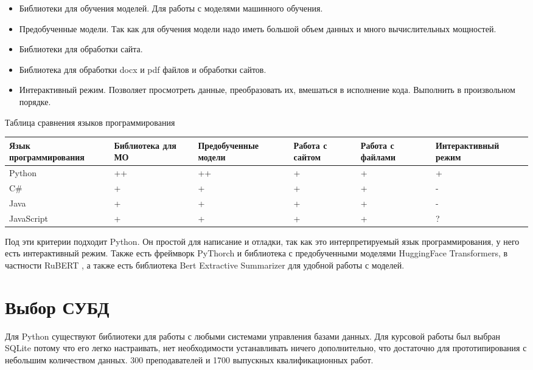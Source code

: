 \documentclass[PI,KR]{HSEUniversity}
\begin{document}
\begin{itemize}
	\item Библиотеки для обучения моделей. Для работы с моделями машинного обучения.
	\item Предобученные модели. Так как для обучения модели надо иметь большой объем данных и много вычислительных мощностей.
	\item Библиотеки для обработки сайта.
	\item Библиотека для обработки docx и pdf файлов и обработки сайтов.
	\item Интерактивный режим. Позволяет просмотреть данные, преобразовать их, вмешаться в исполнение кода. Выполнить в произвольном порядке.
\end{itemize} 

\begin{TABLE}[!h]{Таблица сравнения языков программирования \label{tbl:tableProg}}
	\begin{tabular}[c]{|p{3cm}|p{2cm}|p{3cm}|p{2cm}|p{2cm}|p{3cm}|}
		\hline
		Язык программирования & Библиотека для МО & Предобученные модели & Работа с сайтом & Работа с файлами & Интерактивный режим\\ \hline
		Python 		& ++ & ++ & + & + & + \\ \hline
		C\# 		& +  & +  & + & + & - \\ \hline
		Java 		& +  & +  & + & + & - \\ \hline
		JavaScript 	& +  & +  & + & + & ? \\ \hline
	\end{tabular}
\end{TABLE}

Под эти критерии подходит Python. Он простой для написание и отладки, так как это интерпретируемый язык программирования, у него есть интерактивный режим. Также есть фреймворк PyThorch и библиотека с предобученными моделями HuggingFace Transformers, в частности RuBERT \cite{kuratov2019adaptation}, а также есть библиотека Bert Extractive Summarizer \cite{miller2019leveraging} для удобной работы с моделей.

\section{Выбор СУБД}
Для Python существуют библиотеки для работы с любыми системами управления базами данных. Для курсовой работы был выбран SQLite потому что его легко настраивать, нет необходимости устанавливать ничего дополнительно, что достаточно для прототипирования с небольшим количеством данных. 300 преподавателей и 1700 выпускных квалификационных работ.
\end{document}
